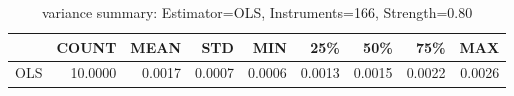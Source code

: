 \begin{table}[ht]
\centering
\caption{variance summary: Estimator=OLS, Instruments=166, Strength=0.80}
\begin{tabular}{lrrrrrrrr}
\toprule
 & COUNT & MEAN & STD & MIN & 25\% & 50\% & 75\% & MAX \\
\midrule
OLS & 10.0000 & 0.0017 & 0.0007 & 0.0006 & 0.0013 & 0.0015 & 0.0022 & 0.0026 \\
\bottomrule
\end{tabular}
\end{table}
